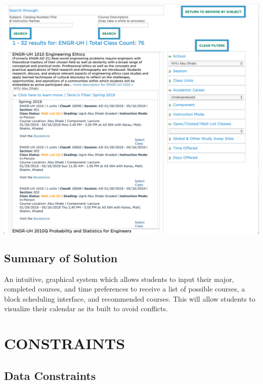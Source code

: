 \documentclass[a4paper, 11.5 pt, conference]{ieeeconf}  %
\begin{document}
\begingroup
    \medskip
    \centering
    \includegraphics[width=\columnwidth]{images/7.png}
    \label{fig:first}
    \medskip
\endgroup

\subsection{Summary of Solution}
An intuitive, graphical system which allows students to input their major, completed courses, and time preferences to receive a list of possible courses, a block scheduling interface, and recommended courses. This will allow students to visualize their calendar as its built to avoid conflicts.






\section{CONSTRAINTS}

\subsection{Data Constraints}
\end{document}
